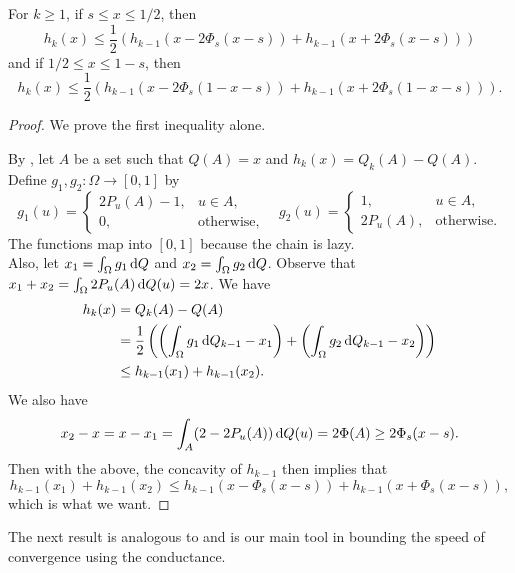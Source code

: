 \begin{theorem}
For $k\geq 1$, if $s\leq x\leq 1/2$, then
\[ h_k(x) \leq \frac{1}{2} \left(h_{k-1}(x-2\Phi_s(x-s)) + h_{k-1}(x+2\Phi_s(x-s))\right) \]
and if $1/2 \leq x\leq 1-s$, then
\[ h_k(x) \leq \frac{1}{2} \left(h_{k-1}(x-2\Phi_s(1-x-s)) + h_{k-1}(x+2\Phi_s(1-x-s))\right). \]
\end{theorem}
\begin{proof}
We prove the first inequality alone.

By , let $A$ be a set such that $Q(A)=x$ and $h_k(x)=Q_k(A)-Q(A)$. Define $g_1,g_2:\Omega\to[0,1]$ by
\[ g_1(u) = 
\begin{cases}
2P_u(A) - 1, & u\in A, \\
0, & \text{otherwise,}
\end{cases}
\quad
g_2(u) = 
\begin{cases}
1, & u\in A, \\
2P_u(A), & \text{otherwise.}
\end{cases}
\]
The functions map into $[0,1]$ because the chain is lazy.\\
Also, let $x_1 = \int_\Omega g_1\operatorname{d}\!{Q}$ and $x_2 = \int_\Omega g_2\operatorname{d}\!{Q}$. Observe that $x_1 + x_2 = \int_\Omega 2P_u(A)\operatorname{d}\!{Q}(u) = 2x$. We have
\begin{align*}
	h_k(x) &= Q_k(A) - Q(A) \\
	&= \frac{1}{2} \left( \left(\int_\Omega g_1\operatorname{d}\!{Q}_{k-1} - x_1\right) + \left( \int_\Omega g_2\operatorname{d}\!{Q}_{k-1} - x_2 \right) \right) \\
	&\leq h_{k-1}(x_1) + h_{k-1}(x_2).
\end{align*}
We also have
\[ x_2-x = x-x_1 = \int_A (2-2P_u(A))\operatorname{d}\!{Q}(u) = 2\Phi(A) \geq 2\Phi_s(x-s). \]
Then with the above, the concavity of $h_{k-1}$ then implies that
\[ h_{k-1}(x_1)+h_{k-1}(x_2) \leq h_{k-1}(x - \Phi_s(x-s)) + h_{k-1}(x+\Phi_s(x-s)), \]
which is what we want.
\end{proof}

The next result is analogous to  and is our main tool in bounding the speed of convergence using the conductance.

